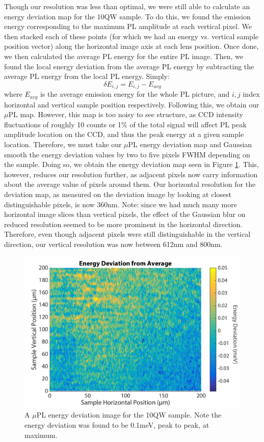 \indent Though our resolution was less than optimal, we were still able to calculate an energy deviation map for the 10QW sample. To do this, we found the emission energy corresponding to the maximum PL amplitude at each vertical pixel. We then stacked each of these points (for which we had an energy vs. vertical sample position vector) along the horizontal image axis at each lens position. Once done, we then calculated the average PL energy for the entire PL image. Then, we found the local energy deviation from the average PL energy by subtracting the average PL energy from the local PL energy. Simply: 
\begin{equation}
\delta E_{i,j} = E_{i,j}-E_{avg}
\end{equation}
where $E_{avg}$ is the average emission energy for the whole PL picture, and $i,j$ index horizontal and vertical sample position respectively. Following this, we obtain our $\mu$PL map. However, this map is too noisy to see structure, as CCD intensity fluctuations of roughly 10 counts or 1\% of the total signal will affect PL peak amplitude location on the CCD, and thus the peak energy at a given sample location. Therefore, we must take our $\mu$PL energy deviation map and Gaussian smooth the energy deviation values by two to five pixels FWHM depending on the sample. Doing so, we obtain the energy deviation map seen in Figure \ref{devmap10QW}. This, however, reduces our resolution further, as adjacent pixels now carry information about the average value of pixels around them. Our horizontal resolution for the deviation map, as measured on the deviation image by looking at closest distinguishable pixels, is now 360nm. Note: since we had much many more horizontal image slices than vertical pixels, the effect of the Gaussian blur on reduced resolution seemed to be more prominent in the horizontal direction. Therefore, even though adjacent pixels were still distinguishable in the vertical direction, our vertical resolution was now between 612nm and 800nm. 

\begin{figure}[h!]
\centering
\includegraphics[width = .8\textwidth]{10qw2px.png}
\caption{ \doublespacing A $\mu$PL energy deviation image for the 10QW sample. Note the energy deviation was found to be 0.1meV, peak to peak, at maximum.}
\label{devmap10QW}
\end{figure}

